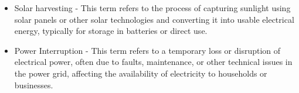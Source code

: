 {\begin{itemize}
	\item Solar harvesting - This term refers to the process of capturing sunlight using solar panels or other solar technologies and converting it into usable electrical energy, typically for storage in batteries or direct use.
	
	\item Power Interruption - This term refers to a temporary loss or disruption of electrical power, often due to faults, maintenance, or other technical issues in the power grid, affecting the availability of electricity to households or businesses.
\end{itemize}


}
